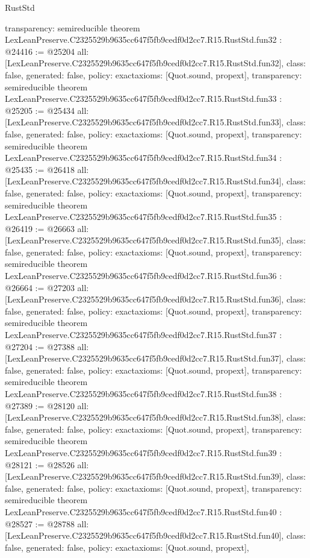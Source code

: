\begin{lexlean}{RustStd}
\begin{coremodule}
{  transparency: semireducible
}
theorem LexLeanPreserve.C2325529b9635cc647f5fb9cedf0d2cc7.R15.RustStd.fun32 : @24416 := @25204 {
  all: [LexLeanPreserve.C2325529b9635cc647f5fb9cedf0d2cc7.R15.RustStd.fun32],
  class: false,
  generated: false,
  policy: exact{axioms: [Quot.sound, propext]},
  transparency: semireducible
}
theorem LexLeanPreserve.C2325529b9635cc647f5fb9cedf0d2cc7.R15.RustStd.fun33 : @25205 := @25434 {
  all: [LexLeanPreserve.C2325529b9635cc647f5fb9cedf0d2cc7.R15.RustStd.fun33],
  class: false,
  generated: false,
  policy: exact{axioms: [Quot.sound, propext]},
  transparency: semireducible
}
theorem LexLeanPreserve.C2325529b9635cc647f5fb9cedf0d2cc7.R15.RustStd.fun34 : @25435 := @26418 {
  all: [LexLeanPreserve.C2325529b9635cc647f5fb9cedf0d2cc7.R15.RustStd.fun34],
  class: false,
  generated: false,
  policy: exact{axioms: [Quot.sound, propext]},
  transparency: semireducible
}
theorem LexLeanPreserve.C2325529b9635cc647f5fb9cedf0d2cc7.R15.RustStd.fun35 : @26419 := @26663 {
  all: [LexLeanPreserve.C2325529b9635cc647f5fb9cedf0d2cc7.R15.RustStd.fun35],
  class: false,
  generated: false,
  policy: exact{axioms: [Quot.sound, propext]},
  transparency: semireducible
}
theorem LexLeanPreserve.C2325529b9635cc647f5fb9cedf0d2cc7.R15.RustStd.fun36 : @26664 := @27203 {
  all: [LexLeanPreserve.C2325529b9635cc647f5fb9cedf0d2cc7.R15.RustStd.fun36],
  class: false,
  generated: false,
  policy: exact{axioms: [Quot.sound, propext]},
  transparency: semireducible
}
theorem LexLeanPreserve.C2325529b9635cc647f5fb9cedf0d2cc7.R15.RustStd.fun37 : @27204 := @27388 {
  all: [LexLeanPreserve.C2325529b9635cc647f5fb9cedf0d2cc7.R15.RustStd.fun37],
  class: false,
  generated: false,
  policy: exact{axioms: [Quot.sound, propext]},
  transparency: semireducible
}
theorem LexLeanPreserve.C2325529b9635cc647f5fb9cedf0d2cc7.R15.RustStd.fun38 : @27389 := @28120 {
  all: [LexLeanPreserve.C2325529b9635cc647f5fb9cedf0d2cc7.R15.RustStd.fun38],
  class: false,
  generated: false,
  policy: exact{axioms: [Quot.sound, propext]},
  transparency: semireducible
}
theorem LexLeanPreserve.C2325529b9635cc647f5fb9cedf0d2cc7.R15.RustStd.fun39 : @28121 := @28526 {
  all: [LexLeanPreserve.C2325529b9635cc647f5fb9cedf0d2cc7.R15.RustStd.fun39],
  class: false,
  generated: false,
  policy: exact{axioms: [Quot.sound, propext]},
  transparency: semireducible
}
theorem LexLeanPreserve.C2325529b9635cc647f5fb9cedf0d2cc7.R15.RustStd.fun40 : @28527 := @28788 {
  all: [LexLeanPreserve.C2325529b9635cc647f5fb9cedf0d2cc7.R15.RustStd.fun40],
  class: false,
  generated: false,
  policy: exact{axioms: [Quot.sound, propext]},
}
\end{coremodule}
\end{lexlean}
